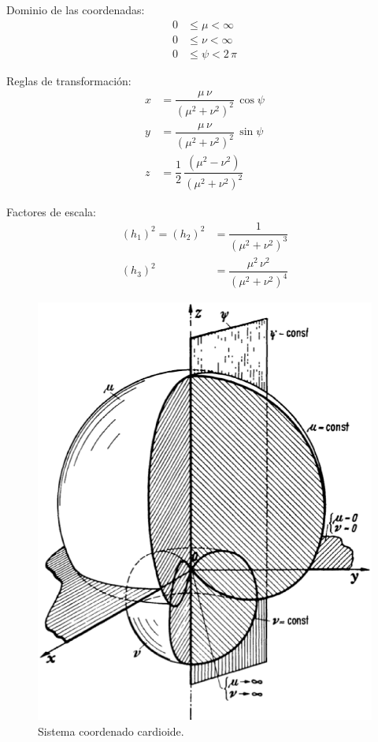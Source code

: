 \documentclass[12pt]{article}
\numberwithin{equation}{section}
\begin{document}
Dominio de las coordenadas:
\begin{align*}
0 &\leq \mu < \infty \\
0 &\leq \nu < \infty \\
0 &\leq \psi < 2 \, \pi
\end{align*}

Reglas de transformación:
\begin{align*}
x &= \dfrac{\mu \, \nu}{(\mu^{2} + \nu^{2})^{2}} \, \cos \psi \\[0.5em]
y &= \dfrac{\mu \, \nu}{(\mu^{2} + \nu^{2})^{2}} \, \sin \psi \\[0.5em]
z &= \dfrac{1}{2} \, \dfrac{(\mu^{2} - \nu^{2})}{(\mu^{2} + \nu^{2})^{2}}
\end{align*}

Factores de escala:
\begin{align*}
(h_{1})^{2} = (h_{2})^{2} &= \dfrac{1}{(\mu^{2} + \nu^{2})^{3}} \\[0.5em]
(h_{3})^{2} &= \dfrac{\mu^{2} \, \nu^{2}}{(\mu^{2} + \nu^{2})^{4}}
\end{align*}

\begin{figure}[H]
    \centering
    \includegraphics[scale=0.5]{Imagenes/Sistema_Cardioide.eps}
    \caption{Sistema coordenado cardioide.}
\end{figure}
\end{document}
